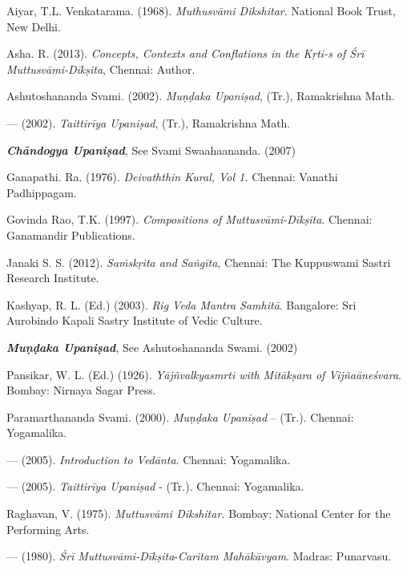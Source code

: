 \begin{thebibliography}{99}
\itemsep=1pt

  Aiyar, T.L. Venkatarama. (1968). \textit{Muthusvāmi Dikshitar}. National Book Trust, New Delhi.

  Asha. R. (2013). \textit{Concepts, Contexts and Conflations in the Kṛti-s of Śrī Muttusvāmi-Dīkṣita}, Chennai: Author.

  Ashutoshananda Svami. (2002). \textit{Muṇḍaka Upaniṣad}, (Tr.), Ramakrishna Math.

  — (2002). \textit{Taittirīya Upaniṣad}, (Tr.), Ramakrishna Math.

  \textbf{\textit{Chāndogya Upaniṣad}}, See Svami Swaahaananda. (2007)

  Ganapathi. Ra. (1976). \textit{Deivaththin Kural, Vol 1.} Chennai: Vanathi Padhippagam.

  Govinda Rao, T.K. (1997). \textit{Compositions of Muttusvāmi-Dīkṣita}. Chennai: Ganamandir Publications.

  Janaki S. S. (2012). \textit{Saṁskṛita and Saṅgīta}, Chennai: The Kuppuswami Sastri Research Institute.

  Kashyap, R. L. (Ed.) (2003). \textit{Rig Veda Mantra Samhitā}. Bangalore: Sri Aurobindo Kapali Sastry Institute of Vedic Culture.

  \textbf{\textit{Muṇḍaka Upaniṣad}}, See Ashutoshananda Swami. (2002)

  Pansikar, W. L. (Ed.) (1926). \textit{Yājñvalkyasmrti with Mitākṣara of Vijñaāneśvara}. Bombay: Nirnaya Sagar Press.

  Paramarthananda Svami. (2000). \textit{Muṇḍaka Upaniṣad} – (Tr.). Chennai: Yogamalika.

  — (2005). \textit{Introduction to Vedānta}. Chennai: Yogamalika.

  — (2005). \textit{Taittirīya Upaniṣad} - (Tr.). Chennai: Yogamalika.

  Raghavan, V. (1975). \textit{Muttusvāmi Dikshitar.} Bombay: National Center for the Performing Arts.

  — (1980). \textit{Śrī Muttusvāmi-Dīkṣita}-\textit{Caritam Mahākāvyam}. Madras: Punarvasu.


\end{thebibliography}
